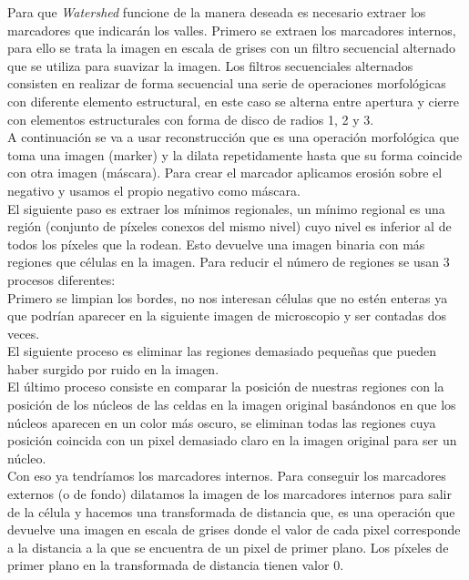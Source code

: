 \documentclass[a4paper,12pt]{report}
\begin{document}
Para que \emph{Watershed} funcione de la manera deseada es necesario extraer los marcadores que indicarán los valles. Primero se extraen los marcadores internos, para ello se trata la imagen en escala de grises con un filtro secuencial alternado que se utiliza para suavizar la imagen. Los filtros secuenciales alternados consisten en realizar de forma secuencial una serie de operaciones morfológicas con diferente elemento estructural, en este caso se alterna entre apertura y cierre con elementos estructurales con forma de disco de radios 1, 2 y 3.\\

A continuación se va a usar reconstrucción que es una operación morfológica que toma una imagen (marker) y la dilata repetidamente hasta que su forma coincide con otra imagen (máscara). Para crear el marcador aplicamos erosión sobre el negativo y usamos el propio negativo como máscara.\\ 

El siguiente paso es extraer los mínimos regionales, un mínimo regional es una región (conjunto de píxeles conexos del mismo nivel) cuyo nivel es inferior al de todos los píxeles que la rodean. Esto devuelve una imagen binaria con más regiones que células en la imagen. Para reducir el número de regiones se usan 3 procesos diferentes:\\

Primero se limpian los bordes, no nos interesan células que no estén enteras ya que podrían aparecer en la siguiente imagen de microscopio y ser contadas dos veces.\\

El siguiente proceso es eliminar las regiones demasiado pequeñas que pueden haber surgido por ruido en la imagen.\\

El último proceso consiste en comparar la posición de nuestras regiones con la posición de los núcleos de las celdas en la imagen original basándonos en que los núcleos aparecen en un color más oscuro, se eliminan todas las regiones cuya posición coincida con un pixel demasiado claro en la imagen original para ser un núcleo.\\

Con eso ya tendríamos los marcadores internos. Para conseguir los marcadores externos (o de fondo) dilatamos la imagen de los marcadores internos para salir de la célula y hacemos una transformada de distancia que, es una operación que devuelve una imagen en escala de grises donde el valor de cada pixel corresponde a la distancia a la que se encuentra de un pixel de primer plano. Los píxeles de primer plano en la transformada de distancia tienen valor 0.\\
\end{document}
